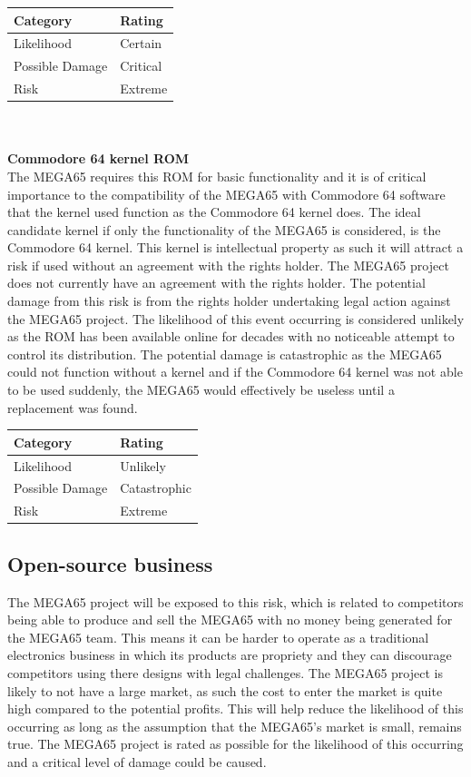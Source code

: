 \begin{tabular}{l|l} %
    	\textbf{Category} 	&	\textbf{Rating} \\
      \hline
     Likelihood			&	Certain \\
     Possible Damage 	& 	Critical \\
     Risk 				&	Extreme		\\	
    \end{tabular} \\ \\


\textbf{Commodore 64 kernel ROM}\\
The MEGA65 requires this ROM for basic functionality and it is of critical importance to the compatibility of the MEGA65 with Commodore 64 software that the kernel used function as the Commodore 64 kernel does. The ideal candidate kernel if only the functionality of the MEGA65 is considered, is the Commodore 64 kernel. This kernel is intellectual property as such it will attract a risk if used without an agreement with the rights holder. The MEGA65 project does not currently have an agreement with the rights holder. The potential damage from this risk is from the rights holder undertaking legal action against the MEGA65 project. The likelihood of this event occurring is considered unlikely as the ROM has been available online for decades with no noticeable attempt to control its distribution. The potential damage is catastrophic as the MEGA65 could not function without a kernel and if the Commodore 64 kernel was not able to be used suddenly, the MEGA65 would effectively be useless until a replacement was found. \\

\begin{tabular}{l|l} %
    	\textbf{Category} 	&	\textbf{Rating} \\
      \hline
     Likelihood			&	Unlikely \\
     Possible Damage 	& 	Catastrophic \\
     Risk 				&	Extreme		\\	
    \end{tabular}


\subsection{Open-source business}
The MEGA65 project will be exposed to this risk, which is related to competitors being able to produce and sell the MEGA65 with no money being generated for the MEGA65 team. This means it can be harder to operate as a traditional electronics business in which its products are propriety and they can discourage competitors using there designs with legal challenges. The MEGA65 project is likely to not have a large market, as such the cost to enter the market is quite high compared to the potential profits. This will help reduce the likelihood of this occurring as long as the assumption that the MEGA65's market is small, remains true. The MEGA65 project is rated as possible for the likelihood of this occurring and a critical level of damage could be caused. \\

